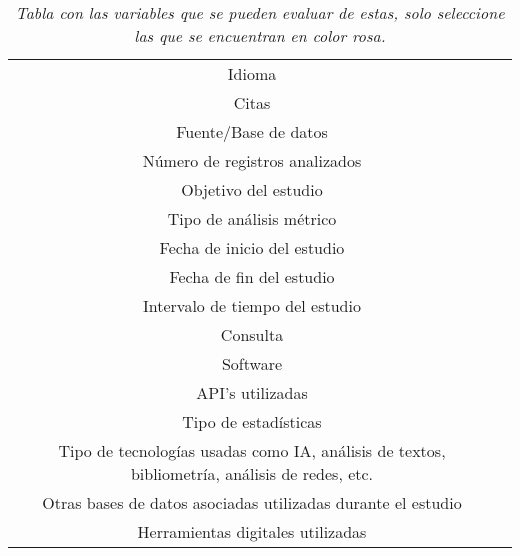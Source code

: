 \documentclass[../Main.tex]{subfiles}
\begin{document}
\begin{table}[H]
\begin{tabular}{|c|c}
Idioma                                                                                        &           \\ \cline{1-1}
Citas                                                                                         &           \\ \cline{1-1}
Fuente/Base de datos                                                                          &           \\ \cline{1-1}
Número de registros analizados                                                                &           \\ \cline{1-1}
Objetivo del estudio                                                                          &           \\ \cline{1-1}
Tipo de análisis métrico                                                                      &           \\ \cline{1-1}
Fecha de inicio del estudio                                                                   &           \\ \cline{1-1}
Fecha de fin del estudio                                                                      &           \\ \cline{1-1}
Intervalo de tiempo del estudio                                                               &           \\ \cline{1-1}
Consulta                                                                                      &           \\ \cline{1-1}
Software                                                                                      &           \\ \cline{1-1}
API’s utilizadas                                                                              &           \\ \cline{1-1}
Tipo de estadísticas                                                                          &           \\ \cline{1-1}
Tipo de tecnologías usadas como IA, análisis de textos, bibliometría, análisis de redes, etc. &           \\ \cline{1-1}
Otras bases de datos asociadas utilizadas durante el estudio                                  &           \\ \cline{1-1}
Herramientas digitales utilizadas                                                             &           \\ \cline{1-1}
\end{tabular}
    \caption{\textit{Tabla con las variables que se pueden evaluar de estas, solo seleccione las que se encuentran en color rosa.}}
    \label{tab:variables}
\end{table}
\end{document}
